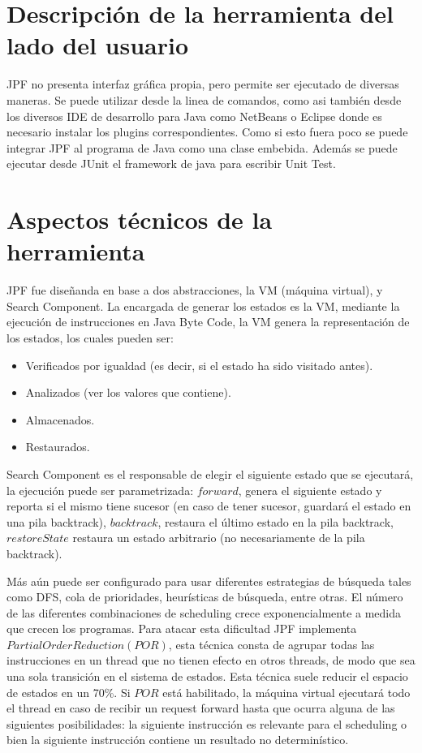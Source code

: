 \documentclass[runningheads]{llncs}
\begin{document}
\section{Descripci\'on de la herramienta del lado del usuario}

JPF no presenta interfaz gr\'afica propia, pero permite ser ejecutado de diversas maneras. Se puede utilizar desde la linea de comandos, como asi tambi\'en desde los diversos IDE de desarrollo para Java como NetBeans o Eclipse donde es necesario instalar los plugins correspondientes. Como si esto fuera poco se puede integrar JPF al programa de Java como una clase embebida.
Adem\'as se puede ejecutar desde JUnit el framework de java para escribir Unit Test.


\section{Aspectos t\'ecnicos de la herramienta}

JPF fue dise\~nanda en base a dos abstracciones, la VM (m\'aquina virtual), y Search Component.
La encargada de generar los estados es la VM, mediante la ejecuci\'on de instrucciones en Java Byte Code, la VM  genera la representaci\'on de los estados, los cuales pueden ser:

\begin{itemize}
\item Verificados por igualdad (es decir, si el estado ha sido visitado antes).
\item Analizados (ver los valores que contiene).
\item Almacenados.
\item Restaurados.
\end{itemize}

Search Component es el responsable de elegir el siguiente estado que se ejecutar\'a, la ejecuci\'on puede ser parametrizada: $forward$, genera el siguiente estado y reporta si el mismo tiene sucesor (en caso de tener sucesor, guardar\'a el estado en una pila backtrack), $backtrack$, restaura el \'ultimo estado en la pila backtrack, $restoreState$ restaura un estado arbitrario (no necesariamente de la pila backtrack).

M\'as a\'un puede ser configurado para usar diferentes estrategias de b\'usqueda tales como DFS, cola de prioridades, heur\'isticas de b\'usqueda,  entre otras.
El n\'umero de las diferentes combinaciones de scheduling crece exponencialmente a medida que crecen los programas. Para atacar esta dificultad JPF implementa $Partial Order Reduction (POR)$, esta t\'ecnica consta de agrupar todas las instrucciones en un thread que no tienen efecto en otros threads, de modo que sea una sola transici\'on en el sistema de estados. Esta t\'ecnica suele reducir el espacio de estados en un 70\%.
Si $POR$ est\'a habilitado, la máquina virtual ejecutar\'a todo el thread en caso de recibir un request forward hasta que ocurra alguna de las siguientes posibilidades: la siguiente instrucci\'on es relevante para el scheduling o bien la siguiente instrucci\'on contiene un resultado no determin\'istico.
\end{document}
